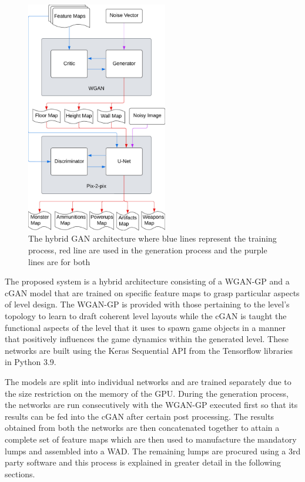 \documentclass{Configuration_Files/PoliMi3i_thesis}
\begin{document}
\begin{figure}
    \includegraphics[width=0.55\textwidth]{hybrid_architecture.jpeg}
    \caption[Hybrid GAN architecture]{The hybrid GAN architecture where blue 
lines represent the training process, red line are used in the generation process and the purple lines are for both}
    \label{fig:hybridarch}
\end{figure}
The proposed system is a hybrid architecture consisting of a WGAN-GP and a cGAN model that are 
trained on specific feature maps to grasp particular aspects of level design. The 
WGAN-GP is provided with those pertaining to the level's topology to learn to draft coherent level 
layouts while the cGAN is taught the functional aspects of the level that it uses to spawn game 
objects in a manner that positively influences the game dynamics within the generated level. 
These networks are built using the Keras Sequential API from the Tensorflow libraries in Python 3.9.

The models are split into individual networks and are trained separately due to the size restriction on 
the memory of the GPU. During the generation process, the networks are run consecutively 
with the WGAN-GP executed first so that its results can be fed into the cGAN after certain 
post processing. The results obtained from both the networks are then concatenated together 
to attain a complete set of feature maps which are then used to manufacture the mandatory 
lumps and assembled into a WAD. The remaining lumps are procured using a 3rd party software 
and this process is explained in greater detail in the following sections.
\end{document}
